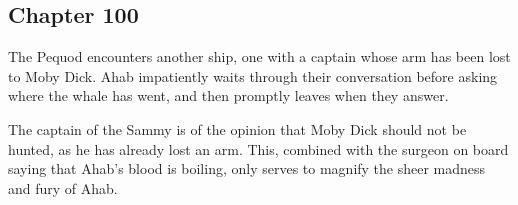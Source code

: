 \subsection{Chapter 100}

The Pequod encounters another ship, one with a captain whose arm has been lost
to Moby Dick. Ahab impatiently waits through their conversation before asking
where the whale has went, and then promptly leaves when they answer.

The captain of the Sammy is of the opinion that Moby Dick should not be hunted,
as he has already lost an arm. This, combined with the surgeon on board saying
that Ahab's blood is boiling, only serves to magnify the sheer madness and fury
of Ahab.
